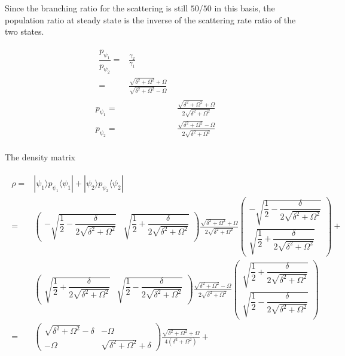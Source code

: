 \documentclass[10pt,fleqn]{article}
\newcommand{\eqar}[1]
{
  \begin{align}
    #1
  \end{align}
}
\newcommand{\paren}[1]{{\left({#1}\right)}}
\begin{document}
Since the branching ratio for the scattering is still $50$/$50$ in this basis,
the population ratio at steady state is the inverse of the scattering rate ratio
of the two states.
\eqar{
  \begin{split}
    \dfrac{p_{\psi_1}}{p_{\psi_2}}=&\frac{\gamma_2}{\gamma_1}\\
    =&\frac{\sqrt{\delta^2+\Omega^2}+\Omega}{\sqrt{\delta^2+\Omega^2}-\Omega}
  \end{split}\\
  p_{\psi_1}=&\frac{\sqrt{\delta^2+\Omega^2}+\Omega}{2\sqrt{\delta^2+\Omega^2}}\\
  p_{\psi_2}=&\frac{\sqrt{\delta^2+\Omega^2}-\Omega}{2\sqrt{\delta^2+\Omega^2}}\\
}
The density matrix
\eqar{
  \begin{split}
    \rho=&|\psi_1\rangle p_{\psi_1}\langle\psi_1|+|\psi_2\rangle p_{\psi_2}\langle\psi_2|\\
    =&\begin{pmatrix}
        -\sqrt{\dfrac12-\dfrac{\delta}{2\sqrt{\delta^2+\Omega^2}}}&\sqrt{\dfrac12+\dfrac{\delta}{2\sqrt{\delta^2+\Omega^2}}}
      \end{pmatrix}
       \frac{\sqrt{\delta^2+\Omega^2}+\Omega}{2\sqrt{\delta^2+\Omega^2}}
       \begin{pmatrix}
         -\sqrt{\dfrac12-\dfrac{\delta}{2\sqrt{\delta^2+\Omega^2}}}\\
         \sqrt{\dfrac12+\dfrac{\delta}{2\sqrt{\delta^2+\Omega^2}}}
       \end{pmatrix}+\\
    &\begin{pmatrix}
       \sqrt{\dfrac12+\dfrac{\delta}{2\sqrt{\delta^2+\Omega^2}}}&\sqrt{\dfrac12-\dfrac{\delta}{2\sqrt{\delta^2+\Omega^2}}}
      \end{pmatrix}
       \frac{\sqrt{\delta^2+\Omega^2}-\Omega}{2\sqrt{\delta^2+\Omega^2}}
       \begin{pmatrix}
         \sqrt{\dfrac12+\dfrac{\delta}{2\sqrt{\delta^2+\Omega^2}}}\\
         \sqrt{\dfrac12-\dfrac{\delta}{2\sqrt{\delta^2+\Omega^2}}}
       \end{pmatrix}\\
    =&\begin{pmatrix}
        \sqrt{\delta^2+\Omega^2}-\delta&-\Omega\\
        -\Omega&\sqrt{\delta^2+\Omega^2}+\delta
      \end{pmatrix}
       \frac{\sqrt{\delta^2+\Omega^2}+\Omega}{4\paren{\delta^2+\Omega^2}}+\\

\end{split}}
\end{document}
